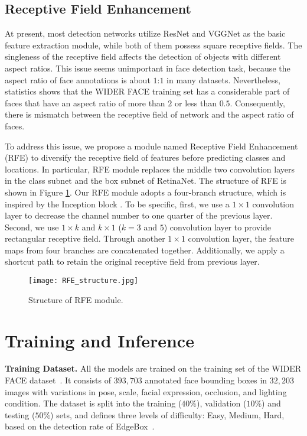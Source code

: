 \documentclass[letterpaper]{article} \usepackage{aaai19m}  \usepackage{times}  \usepackage{helvet}  \usepackage{courier}  \usepackage{url}  \usepackage{graphicx}  \usepackage{subfigure}
\begin{document}
\subsection{Receptive Field Enhancement}
At present, most detection networks utilize ResNet and VGGNet as the basic feature extraction module, while both of them possess square receptive fields. The singleness of the receptive field affects the detection of objects with different aspect ratios. This issue seems unimportant in face detection task, because the aspect ratio of face annotations is about $1$:$1$ in many datasets. Nevertheless, statistics shows that the WIDER FACE training set has a considerable part of faces that have an aspect ratio of more than $2$ or less than $0.5$. Consequently, there is mismatch between the receptive field of network and the aspect ratio of faces.

To address this issue, we propose a module named Receptive Field Enhancement (RFE) to diversify the receptive field of features before predicting classes and locations. In particular, RFE module replaces the middle two convolution layers in the class subnet and the box subnet of RetinaNet. The structure of RFE is shown in Figure \ref{fig:rfe}. Our RFE module adopts a four-branch structure, which is inspired by the Inception block \cite{DBLP:conf/cvpr/SzegedyLJSRAEVR15}. To be specific, first, we use a $1\times1$ convolution layer to decrease the channel number to one quarter of the previous layer. Second, we use $1\times k$ and $k\times 1$ ($k=3$ and $5$) convolution layer to provide rectangular receptive field. Through another $1\times1$ convolution layer, the feature maps from four branches are concatenated together. Additionally, we apply a shortcut path to retain the original receptive field from previous layer.

\begin{figure}[t!]
\centering
\texttt{[image: RFE\_structure.jpg]}
\caption{Structure of RFE module.}
\label{fig:rfe}
\end{figure}


\section{Training and Inference}

{\flushleft \textbf{Training Dataset.} }
All the models are trained on the training set of the WIDER FACE dataset~\cite{DBLP:conf/cvpr/YangLLT16}. It consists of $393,703$ annotated face bounding boxes in $32,203$ images with variations in pose, scale, facial expression, occlusion, and lighting condition. The dataset is split into the training ($40\%$), validation ($10\%$) and testing ($50\%$) sets, and defines three levels of difficulty: Easy, Medium, Hard, based on the detection rate of EdgeBox~\cite{DBLP:conf/eccv/ZitnickD14}.
\end{document}
